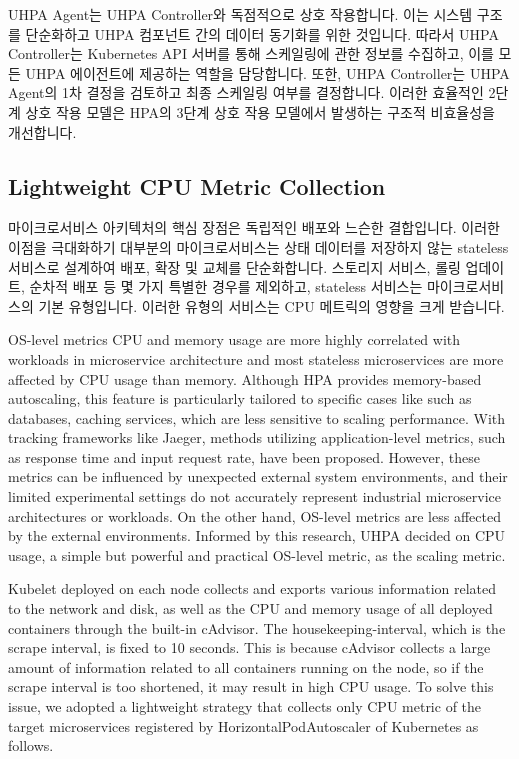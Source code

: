 \documentclass[conference]{IEEEtran}
\begin{document}
UHPA Agent는 UHPA Controller와 독점적으로 상호 작용합니다. 이는 시스템 구조를 단순화하고 UHPA 컴포넌트 간의 데이터 동기화를 위한 것입니다. 따라서 UHPA Controller는 Kubernetes API 서버를 통해 스케일링에 관한 정보를 수집하고, 이를 모든 UHPA 에이전트에 제공하는 역할을 담당합니다. 또한, UHPA Controller는 UHPA Agent의 1차 결정을 검토하고 최종 스케일링 여부를 결정합니다. 이러한 효율적인 2단계 상호 작용 모델은 HPA의 3단계 상호 작용 모델에서 발생하는 구조적 비효율성을 개선합니다.

\subsection{Lightweight CPU Metric Collection}
마이크로서비스 아키텍처의 핵심 장점은 독립적인 배포와 느슨한 결합입니다\cite{MicroservicesIO}. 이러한 이점을 극대화하기 대부분의 마이크로서비스는 상태 데이터를 저장하지 않는 stateless 서비스로 설계하여 배포, 확장 및 교체를 단순화합니다\cite{gan2019open}\cite{AWSStatefulActorServices2023}. 스토리지 서비스, 롤링 업데이트, 순차적 배포 등 몇 가지 특별한 경우를 제외하고, stateless 서비스는 마이크로서비스의 기본 유형입니다\cite{KubernetesStatefulSet2023}. 이러한 유형의 서비스는 CPU 메트릭의 영향을 크게 받습니다.

OS-level metrics CPU and memory usage are more highly correlated with workloads in microservice architecture\cite{luo2022power} and most stateless microservices are more affected by CPU usage than memory. Although HPA provides memory-based autoscaling, this feature is particularly tailored to specific cases like such as databases, caching services, which are less sensitive to scaling performance. With tracking frameworks like Jaeger\cite{JaegerTracing}, methods utilizing application-level metrics, such as response time and input request rate, have been proposed\cite{he2020novel}\cite{pramesti2022autoscaling}. However, these metrics can be influenced by unexpected external system environments, and their limited experimental settings do not accurately represent industrial microservice architectures or workloads\cite{huye2023lifting}. On the other hand, OS-level metrics are less affected by the external environments. Informed by this research, UHPA decided on CPU usage, a simple but powerful and practical OS-level metric, as the scaling metric.

Kubelet deployed on each node collects and exports various information related to the network and disk, as well as the CPU and memory usage of all deployed containers through the built-in cAdvisor. The housekeeping-interval, which is the scrape interval, is fixed to 10 seconds. This is because cAdvisor collects a large amount of information related to all containers running on the node, so if the scrape interval is too shortened, it may result in high CPU usage\cite{KubecostcAdvisor}. To solve this issue, we adopted a lightweight strategy that collects only CPU metric of the target microservices registered by HorizontalPodAutoscaler of Kubernetes as follows.
\end{document}
